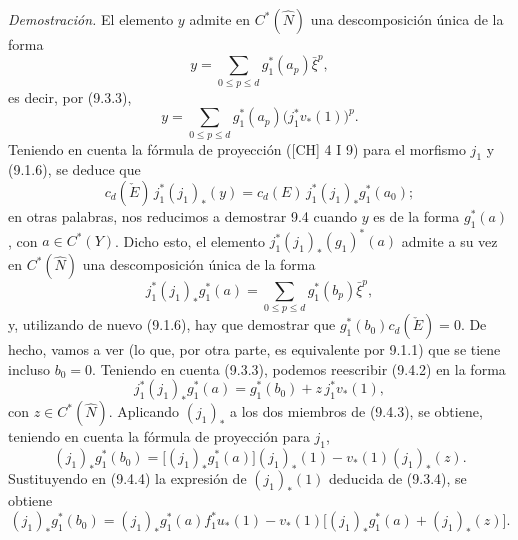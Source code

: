\emph{Demostración.} El elemento $y$ admite en $C^*(\widehat N)$ una descomposición única de la forma
\[
y=\sum_{0\le p\le d}g_1^*(a_p)\bar\xi^p,
\]
es decir, por (9.3.3),
\[
y=\sum_{0\le p\le d}g_1^*(a_p)\bigl(j_1^*v_*(1)\bigr)^p.
\tag{9.4.1}
\]
Teniendo en cuenta la fórmula de proyección ([CH] 4 I 9) para el morfismo $j_1$ y (9.1.6), se deduce que
\[
c_d(\check E)\,j_1^*(j_1)_*(y)=c_d(E)\,j_1^*(j_1)_*g_1^*(a_0);
\]
en otras palabras, nos reducimos a demostrar 9.4 cuando $y$ es de la forma $g_1^*(a)$, con $a\in C^*(Y)$. Dicho esto, el elemento $j_1^*(j_1)_*(g_1)^*(a)$ admite a su vez en $C^*(\widehat N)$ una descomposición única de la forma
\[
j_1^*(j_1)_*g_1^*(a)=\sum_{0\le p\le d}g_1^*(b_p)\bar\xi^p,
\tag{9.4.2}
\]
y, utilizando de nuevo (9.1.6), hay que demostrar que $g_1^*(b_0)c_d(\check E)=0$. De hecho, vamos a ver (lo que, por otra parte, es equivalente por 9.1.1) que se tiene incluso $b_0=0$. Teniendo en cuenta (9.3.3), podemos reescribir (9.4.2) en la forma
\[
j_1^*(j_1)_*g_1^*(a)=g_1^*(b_0)+z\,j_1^*v_*(1),
\tag{9.4.3}
\]
con $z\in C^*(\widehat N)$. Aplicando $(j_1)_*$ a los dos miembros de (9.4.3), se obtiene, teniendo en cuenta la fórmula de proyección para $j_1$,
\[
(j_1)_*g_1^*(b_0)=\bigl[(j_1)_*g_1^*(a)\bigr](j_1)_*(1)-v_*(1)(j_1)_*(z).
\tag{9.4.4}
\]
Sustituyendo en (9.4.4) la expresión de $(j_1)_*(1)$ deducida de (9.3.4), se obtiene
\[
(j_1)_*g_1^*(b_0)=
(j_1)_*g_1^*(a)f_1^*u_*(1)-v_*(1)\bigl[(j_1)_*g_1^*(a)+(j_1)_*(z)\bigr].
\tag{9.4.5}
\]
